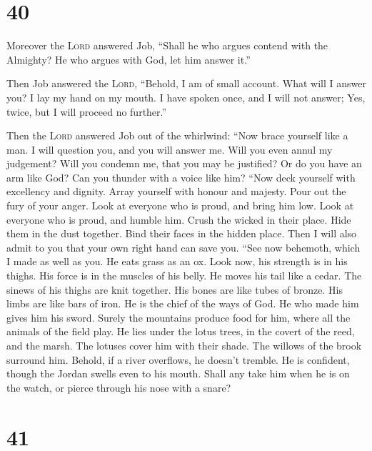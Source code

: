 \hypertarget{section-39}{%
\section{40}\label{section-39}}

 Moreover the \textsc{Lord} answered Job, 
``Shall he who argues contend with the Almighty? He who argues with God,
let him answer it.''

 Then Job answered the \textsc{Lord}, 
``Behold, I am of small account. What will I answer you? I lay my hand
on my mouth.  I have spoken once, and I will not answer;
Yes, twice, but I will proceed no further.''

 Then the \textsc{Lord} answered Job out of the whirlwind:
 ``Now brace yourself like a man. I will question you, and
you will answer me.  Will you even annul my judgement?
Will you condemn me, that you may be justified?  Or do you
have an arm like God? Can you thunder with a voice like him?
 ``Now deck yourself with excellency and dignity. Array
yourself with honour and majesty.  Pour out the fury of
your anger. Look at everyone who is proud, and bring him low.
 Look at everyone who is proud, and humble him. Crush the
wicked in their place.  Hide them in the dust together.
Bind their faces in the hidden place.  Then I will also
admit to you that your own right hand can save you. 
``See now behemoth, which I made as well as you. He eats grass as an ox.
 Look now, his strength is in his thighs. His force is in
the muscles of his belly.  He moves his tail like a
cedar. The sinews of his thighs are knit together.  His
bones are like tubes of bronze. His limbs are like bars of iron.
 He is the chief of the ways of God. He who made him
gives him his sword.  Surely the mountains produce food
for him, where all the animals of the field play.  He
lies under the lotus trees, in the covert of the reed, and the marsh.
 The lotuses cover him with their shade. The willows of
the brook surround him.  Behold, if a river overflows, he
doesn't tremble. He is confident, though the Jordan swells even to his
mouth.  Shall any take him when he is on the watch, or
pierce through his nose with a snare?

\hypertarget{section-40}{%
\section{41}\label{section-40}}

